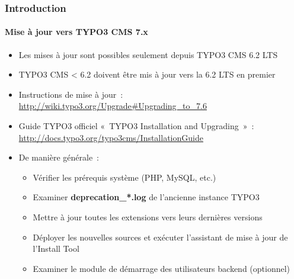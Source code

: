 \begin{frame}[fragile]
	\frametitle{Introduction}
	\framesubtitle{Mise à jour vers TYPO3 CMS 7.x}

	\begin{itemize}
		\item Les mises à jour sont possibles seulement depuis TYPO3 CMS 6.2 LTS
		\item TYPO3 CMS < 6.2 doivent être mis à jour vers la 6.2 LTS en premier
	\end{itemize}

	\begin{itemize}

		\item Instructions de mise à jour~:\newline
			\smaller\url{http://wiki.typo3.org/Upgrade#Upgrading_to_7.6}\normalsize
		\item Guide TYPO3 officiel «~TYPO3 Installation and Upgrading~»~:
			\smaller\url{http://docs.typo3.org/typo3cms/InstallationGuide}\normalsize
		\item De manière générale~:
			\begin{itemize}
				\item Vérifier les prérequis système \small(PHP, MySQL, etc.)
				\item Examiner \textbf{deprecation\_*.log} de l'ancienne instance TYPO3
				\item Mettre à jour toutes les extensions vers leurs dernières versions
				\item Déployer les nouvelles sources et exécuter l'assistant de mise à jour de l'Install Tool
				\item Examiner le module de démarrage des utilisateurs backend (optionnel)
			\end{itemize}
	\end{itemize}

\end{frame}

